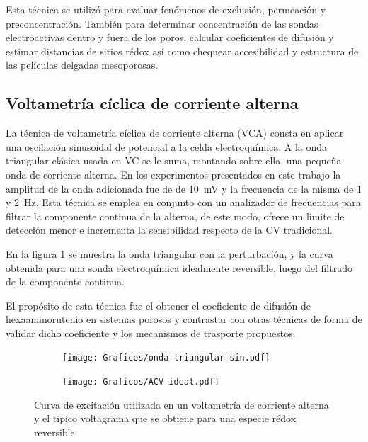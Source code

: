 	 		Esta técnica se utilizó para evaluar fenómenos de exclusión, permeación y preconcentración. También para determinar concentración de las sondas electroactivas dentro y fuera de los poros, calcular coeficientes de difusión y estimar distancias de sitios rédox así como chequear accesibilidad y estructura de las películas delgadas mesoporosas.

	 \subsection{Voltametría cíclica de corriente alterna}

	 		La técnica de voltametría cíclica de corriente alterna (VCA) consta en aplicar una oscilación sinusoidal de potencial a la celda electroquímica. A la onda triangular clásica usada en VC se le suma, montando sobre ella, una pequeña onda de corriente alterna. En los experimentos presentados en este trabajo la amplitud de la onda adicionada fue de de \SI{10}{\milli\volt} y la frecuencia de la misma de 1 y \SI{2}{\hertz}. Esta técnica se emplea en conjunto con un analizador de frecuencias para filtrar la componente continua de la alterna, de este modo, ofrece un limite de detección menor e incrementa la sensibilidad respecto de la CV tradicional.\cite{Wi2000,Skoog1995}

	 		En la figura \ref{fig:ACV_ideal} se muestra la onda triangular con la perturbación, y la curva obtenida para una sonda electroquímica idealmente reversible, luego del filtrado de la componente continua.

	 		El propósito de esta técnica fue el obtener el coeficiente de difusión de hexaaminorutenio en sistemas porosos y contrastar con otras técnicas de forma de validar dicho coeficiente y los mecanismos de trasporte propuestos. 

	 			 \begin{figure}[hb!]
			  		  \begin{subfigure}[t]{0.495\textwidth}
			  		  \texttt{[image: Graficos/onda-triangular-sin.pdf]}
			  		  \end{subfigure}
			  		  \begin{subfigure}[t]{0.495\textwidth}
			  		  \texttt{[image: Graficos/ACV-ideal.pdf]}
			  		  \end{subfigure}
			  		  \caption[Voltamperometria ideal reversible]{Curva de excitación utilizada en un voltametría de corriente alterna y el típico voltagrama que se obtiene para una especie rédox reversible.}
			  		  \label{fig:ACV_ideal}
			  		  \end{figure}
			

